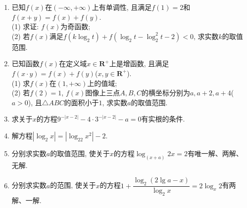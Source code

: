 \documentclass[10pt,a4paper]{article}
\begin{document}
\begin{enumerate}[1.]
\item 已知$f(x)$在$(-\infty ,+\infty)$上有单调性, 且满足$f(1)=2$和$f(x+y)=f(x)+f(y)$.\\
(1) 求证: $f(x)$为奇函数;\\
(2) 若$f(x)$满足$f(k\log_2t)+f(\log_2t-\log_2^2t-2)<0$, 求实数$k$的取值范围.
\item 已知函数$f(x)$在定义域$x\in \mathbf{R}^+$上是增函数, 且满足$f(x\cdot y)=f(x)+f(y)$($x,y\in \mathbf{R}^+$).\\
(1) 求$f(x)$在$(1,+\infty)$上的值域;\\
(2) 若$f(2)=1$, $f(x)$图像上三点$A,B,C$的横坐标分别为$a,a+2,a+4$($a>0$), 且$\triangle ABC$的面积小于$1$, 求实数$a$的取值范围.
\item 求关于$x$的方程$9^{-|x-2|}-4\cdot 3^{-|x-2|}-a=0$有实根的条件.
\item 解方程$|\log_2x|=|\log_22x^2|-2$.
\item 分别求实数$a$的取值范围, 使关于$x$的方程$\log_{(x+a)}2x=2$有唯一解、两解、无解.
\item 分别求实数$a$的范围, 使关于$x$的方程$1+\dfrac{\log_2(2\lg a-x)}{\log_2x}=2\log_x2$有两解、一解.


\end{enumerate}
\end{document}
